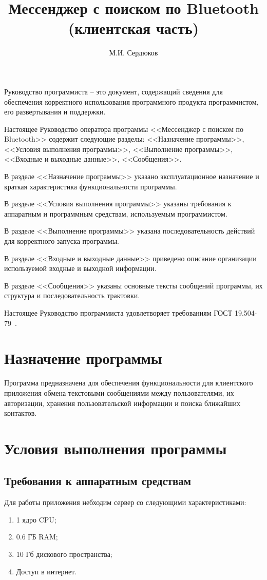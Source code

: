 \documentclass[progmanual]{espd}
\author{М.И. Сердюков}
\title{Мессенджер с поиском по Bluetooth\\(клиентская часть)}
\begin{document}
\annotation

Руководство программиста -- это документ, содержащий сведения для обеспечения корректного использования программного продукта программистом, его развертывания и поддержки.

Настоящее Руководство оператора программы <<Мессенджер с поиском по Bluetooth>>  содержит следующие разделы: <<Назначение программы>>, <<Условия выполнения программы>>, <<Выполнение программы>>, <<Входные и выходные данные>>, <<Сообщения>>.

В разделе <<Назначение программы>> указано эксплуатационное назначение и краткая характеристика функциональности программы.

В разделе <<Условия выполнения программы>> указаны требования к аппаратным и программным средствам, используемым программистом.

В разделе <<Выполнение программы>> указана последовательность действий для корректного запуска программы.

В разделе <<Входные и выходные данные>> приведено описание организации используемой входные и выходной информации.

В разделе <<Сообщения>> указаны основные тексты сообщений программы, их структура и последовательность трактовки.

Настоящее Руководство программиста удовлетворяет требованиям ГОСТ 19.504-79~\cite{espd504}.

\tableofcontents

\section{Назначение программы}
Программа предназначена для обеспечения функциональности для клиентского приложения обмена текстовыми сообщениями между пользователями, их авторизации, хранения пользовательской информации и поиска ближайших контактов.

\section{Условия выполнения программы}
\subsection{Требования к аппаратным средствам}
Для работы приложения небходим сервер со следующими характеристиками:
\begin{enumerate}
\item 1 ядро CPU;
\item 0.6 ГБ RAM;
\item 10 Гб дискового пространства;
\item Доступ в интернет.
\end{enumerate}
\end{document}
